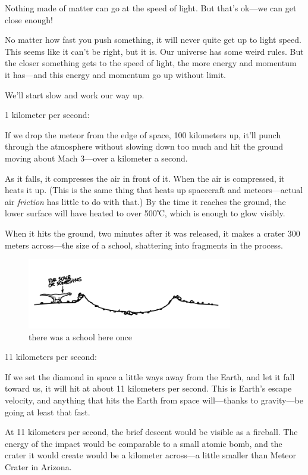 \hfill{}

{Nothing made of matter can go at the speed of light. But that’s ok—we can get close enough!}

{No matter how fast you push something, it will never quite get up to light speed. This seems like it can’t be right, but it is. Our universe has some weird rules. But the closer something gets to the speed of light, the more energy and momentum it has—and this energy and momentum go up without limit.}

{We’ll start slow and work our way up.}

{1 kilometer per second:}

{If we drop the meteor from the edge of space, 100 kilometers up, it’ll punch through the atmosphere without slowing down too much and hit the ground moving about Mach 3—over a kilometer a second.}

{As it falls, it compresses the air in front of it. When the air is compressed, it heats it up. (This is the same thing that heats up spacecraft and meteors—actual air \emph{friction} has little to do with that.) By the time it reaches the ground, the lower surface will have heated to over 500℃, which is enough to glow visibly.}

{When it hits the ground, two minutes after it was released, it makes a crater 300 meters across—the size of a school, shattering into fragments in the process.}

\begin{figure}[!htbp]
\centering
\includegraphics[scale=0.5, max width=0.8\textwidth]{imgs/a/20/diamond_1.png}
\caption{there was a school here once}
\end{figure}

{11 kilometers per second:}

{If we set the diamond in space a little ways away from the Earth, and let it fall toward us, it will hit at about 11 kilometers per second. This is Earth’s escape velocity, and anything that hits the Earth from space will—thanks to gravity—be going at least that fast.}

{At 11 kilometers per second, the brief descent would be visible as a fireball. The energy of the impact would be comparable to a small atomic bomb, and the crater it would create would be a kilometer across—a little smaller than Meteor Crater in Arizona.}

